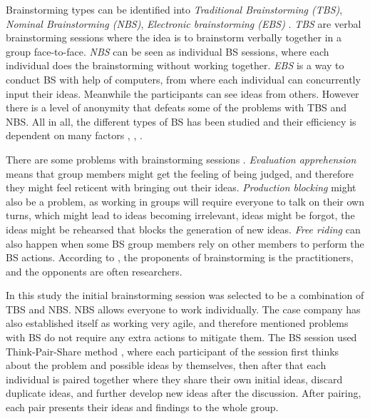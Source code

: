 \documentclass[english, 12pt, a4paper, sci, utf8, a-1b, online]{aaltothesis}
\begin{document}
Brainstorming types can be identified into \textit{Traditional Brainstorming (TBS)}, \textit{Nominal Brainstorming (NBS)}, \textit{Electronic brainstorming (EBS)} \parencite{brainstorming-techniques}. \textit{TBS} are verbal brainstorming sessions where the idea is to brainstorm verbally together in a group face-to-face. \textit{NBS} can be seen as individual BS sessions, where each individual does the brainstorming without working together. \textit{EBS} is a way to conduct BS with help of computers, from where each individual can concurrently input their ideas. Meanwhile the participants can see ideas from others. However there is a level of anonymity that defeats some of the problems with TBS and NBS.  All in all, the different types of BS has been studied and their efficiency is dependent on many factors \parencite{productivity-loss-in-brainstorming-groups}, \parencite{electronic-brainstorming}, \parencite{chainstorm}.

There are some problems with brainstorming sessions \parencite{electronic-brainstorming} \parencite{chainstorm}. \textit{Evaluation apprehension} means that group members might get the feeling of being judged, and therefore they might feel reticent with bringing out their ideas. \textit{Production blocking} might also be a problem, as working in groups will require everyone to talk on their own turns, which might lead to ideas becoming irrelevant, ideas might be forgot, the ideas might be rehearsed that blocks the generation of new ideas. \textit{Free riding} can also happen when some BS group members rely on other members to perform the BS actions. According to \textcite{six-issues-of-brainstorming}, the proponents of brainstorming is the practitioners, and the opponents are often researchers.

In this study the initial brainstorming session was selected to be a combination of TBS and NBS. NBS allows everyone to work individually. The case company has also established itself as working very agile, and therefore mentioned problems with BS do not require any extra actions to mitigate them. The BS session used Think-Pair-Share method \parencite{think-pair-share}, where each participant of the session first thinks about the problem and possible ideas by themselves, then after that each individual is paired together where they share their own initial ideas, discard duplicate ideas, and further develop new ideas after the discussion. After pairing, each pair presents their ideas and findings to the whole group.

\end{document}
